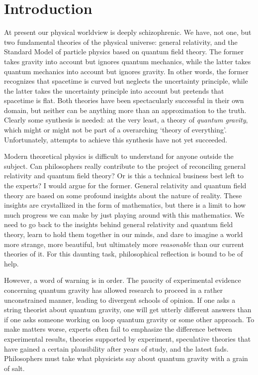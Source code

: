 \section{Introduction}

At present our physical worldview is deeply schizophrenic.  We have, not
one, but two fundamental theories of the physical universe: general
relativity, and the Standard Model of particle physics based on quantum
field theory.  The former takes gravity into account but ignores quantum
mechanics, while the latter takes quantum mechanics into account but
ignores gravity.  In other words, the former recognizes that spacetime
is curved but neglects the uncertainty principle, while the latter takes
the uncertainty principle into account but pretends that spacetime is
flat.  Both theories have been spectacularly successful in their own
domain, but neither can be anything more than an approximation to the
truth.   Clearly some synthesis is needed: at the very least, a theory 
of {\it quantum gravity}, which might or might not be part of a
overarching `theory of everything'.   Unfortunately, attempts to achieve
this synthesis have not yet succeeded.

Modern theoretical physics is difficult to understand for anyone outside
the subject.  Can philosophers really contribute to the project of
reconciling general relativity and quantum field theory?  Or is this a
technical business best left to the experts?  I would argue for the
former.  General relativity and quantum field theory are based on some
profound insights about the nature of reality.    These insights are
crystallized in the form of mathematics, but there is a limit to how
much progress we can make by just playing around with this mathematics.
We need to go back to the insights behind general relativity and quantum
field theory, learn to hold them together in our minds, and dare to
imagine a world more strange, more beautiful, but ultimately more {\it
reasonable} than our current theories of it.  For this daunting task,
philosophical reflection is bound to be of help.  

However, a word of warning is in order.  The paucity of experimental
evidence concerning quantum gravity has allowed research to proceed in a
rather unconstrained manner, leading to divergent schools of opinion. 
If one asks a string theorist about quantum gravity, one will get
utterly different answers than if one asks someone working on loop
quantum gravity or some other approach.  To make matters worse, experts
often fail to emphasize the difference between experimental results,
theories supported by experiment, speculative theories that have gained
a certain plausibility after years of study, and the latest fads. 
Philosophers must take what physicists say about quantum gravity with a
grain of salt.  

